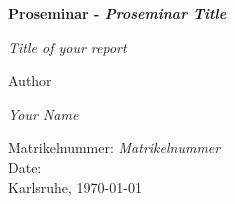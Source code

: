 \begin{titlepage}
\begin{center}
	\vspace{3em}	
    {\Huge\bfseries Proseminar - \textit{Proseminar Title}\par}
    \vspace{2em}
    {\huge \textit{Title of your report} \par}
    \vspace{3em}
    Author\\
	\vspace{1em}
    {\Large \textit{Your Name}\par}
    \vspace{1em}
    Matrikelnummer: \textit{Matrikelnummer}\\
    \vspace{3em}
    Date:\\
	\vspace{1em}
    Karlsruhe, \today
\end{center}
\end{titlepage}